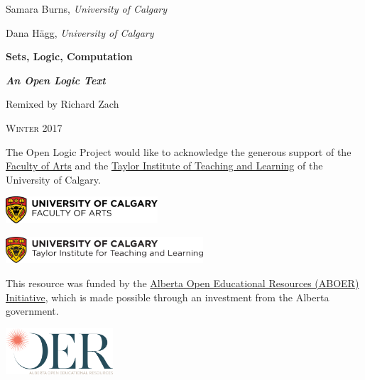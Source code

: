 Samara Burns, \emph{University of Calgary}

Dana H\"agg, \emph{University of Calgary}

\newpage


\vspace*{100pt}

\begin{raggedleft}

{\fontsize{24pt}{24pt}\selectfont\bfseries\sffamily%
  Sets, Logic, Computation}

\smallskip

{\fontsize{18pt}{18pt}\selectfont\bfseries\itshape An Open Logic Text}

\vspace{100pt}

\fontsize{14pt}{14pt}\selectfont Remixed by Richard Zach

\vfill

\textsc{Winter 2017} %

\end{raggedleft}


\newpage


\noindent
The Open Logic Project would like to acknowledge the generous support
of the \href{http://arts.ucalgary.ca/}{Faculty of Arts} and
the \href{http://www.ucalgary.ca/taylorinstitute/}{Taylor Institute of
Teaching and Learning} of the University of Calgary.

\bigskip

\noindent\includegraphics[height=1cm]{ucarts-color}

\medskip

\noindent\includegraphics[height=1cm]{ti-color}

\bigskip\noindent
This resource was funded by the \href{http://albertaoer.com}{Alberta
Open Educational Resources (ABOER) Initiative}, which is made possible
through an investment from the Alberta government.

\noindent\includegraphics[width=4cm]{aboer-color}

